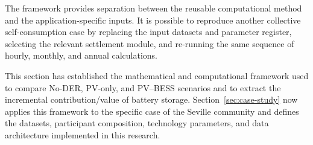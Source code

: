 The framework provides separation between the reusable computational method and the application-specific inputs. It is possible to reproduce another collective self-consumption case by replacing the input datasets and parameter register, selecting the relevant settlement module, and re-running the same sequence of hourly, monthly, and annual calculations.

This section has established the mathematical and computational framework used to compare No-DER, PV-only, and PV--BESS scenarios and to extract the incremental contribution/value of battery storage. Section~\ref{sec:case-study} now applies this framework to the specific case of the Seville community and defines the datasets, participant composition, technology parameters, and data architecture implemented in this research.
